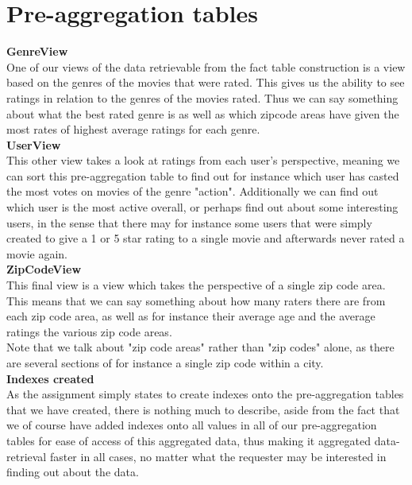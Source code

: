 \section*{Pre-aggregation tables}

\noindent\textbf{GenreView} \\
One of our views of the data retrievable from the fact table construction is a view based on the genres of the movies that were rated. This gives us the ability to see ratings in relation to the genres of the movies rated. Thus we can say something about what the best rated genre is as well as which zipcode areas have given the most rates of highest average ratings for each genre. \\

\noindent\textbf{UserView} \\
This other view takes a look at ratings from each user's perspective, meaning we can sort this pre-aggregation table to find out for instance which user has casted the most votes on movies of the genre "action". Additionally we can find out which user is the most active overall, or perhaps find out about some interesting users, in the sense that there may for instance some users that were simply created to give a 1 or 5 star rating to a single movie and afterwards never rated a movie again. \\

\noindent\textbf{ZipCodeView} \\
This final view is a view which takes the perspective of a single zip code area. This means that we can say something about how many raters there are from each zip code area, as well as for instance their average age and the average ratings the various zip code areas. \\
\indent Note that we talk about "zip code areas" rather than "zip codes" alone, as there are several sections of for instance a single zip code within a city. \\

\noindent\textbf{Indexes created} \\
As the assignment simply states to create indexes onto the pre-aggregation tables that we have created, there is nothing much to describe, aside from the fact that we of course have added indexes onto all values in all of our pre-aggregation tables for ease of access of this aggregated data, thus making it aggregated data-retrieval faster in all cases, no matter what the requester may be interested in finding out about the data.